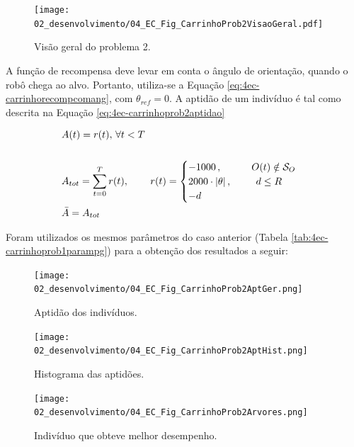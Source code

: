 \begin{figure}[H]
	\centering
	\texttt{[image: 02\_desenvolvimento/04\_EC\_Fig\_CarrinhoProb2VisaoGeral.pdf]}
	\caption{Visão geral do problema 2.}
	\label{fig:4ec-carrinhoprob2visaogeral}
\end{figure}

A função de recompensa deve levar em conta o ângulo de orientação, quando o robô chega ao alvo. Portanto, utiliza-se a Equação \ref{eq:4ec-carrinhorecompcomang}, com $\theta_{ref}=0$. A aptidão de um indivíduo é tal como descrita na Equação \ref{eq:4ec-carrinhoprob2aptidao}

\begin{align}\label{eq:4ec-carrinhoprob2aptidao}
\begin{split}
&A(t) = r(t),\,\forall t<T\\\\
&A_{tot} = \sum_{t=0}^{T} r(t),\,\qquad r(t) =
\begin{cases}
-1000\,,\qquad\hspace{1em} O(t)\notin\mathcal{S}_O\\
2000\cdot|\theta|\,,\qquad\hspace{0.45em} d\le R\\
-d\qquad
\end{cases} \\
&\bar{A} = A_{tot}
\end{split}
\end{align}

Foram utilizados os mesmos parâmetros do caso anterior (Tabela \ref{tab:4ec-carrinhoprob1parampg}) para a obtenção dos resultados a seguir:

\begin{figure}[H]
	\centering
	\texttt{[image: 02\_desenvolvimento/04\_EC\_Fig\_CarrinhoProb2AptGer.png]}
	\caption{Aptidão dos indivíduos.}
	\label{fig:4ec-carrinhoprob2aptger}
\end{figure}

\begin{figure}[H]
	\centering
	\texttt{[image: 02\_desenvolvimento/04\_EC\_Fig\_CarrinhoProb2AptHist.png]}
	\caption{Histograma das aptidões.}
	\label{fig:4ec-carrinhoprob2apthist}
\end{figure}

\begin{figure}[H]
	\centering
	\texttt{[image: 02\_desenvolvimento/04\_EC\_Fig\_CarrinhoProb2Arvores.png]}
	\caption{Indivíduo que obteve melhor desempenho.}
	\label{fig:4ec-carrinhoprob2arvores}
\end{figure}

